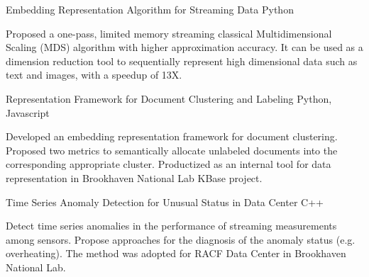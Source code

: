 


\begin{cventries}


\projentry
{Embedding Representation Algorithm for Streaming Data} %
{Python} %
{ 
\begin{cvitems}
\item{Proposed a one-pass, limited memory streaming classical Multidimensional Scaling ({MDS}) algorithm with higher approximation accuracy. It can be used as a dimension reduction tool to sequentially represent high dimensional data such as text and images, with a speedup of 13X.}
\end{cvitems}
}


\projentry
{Representation Framework for Document Clustering and Labeling} %
{Python, Javascript} %
{ 
\begin{cvitems}
\item{Developed an embedding representation framework for document clustering. Proposed two metrics to semantically allocate unlabeled documents into the corresponding appropriate cluster. Productized as an internal tool for data representation in Brookhaven National Lab KBase project.}
\end{cvitems}
}


\projentry
{Time Series Anomaly Detection for Unusual Status in Data Center} %
{C++} %
{ %
\begin{cvitems}
\item{Detect time series anomalies in the performance of streaming measurements among sensors. Propose approaches for the diagnosis of the anomaly status (e.g. overheating). The method was adopted for RACF Data Center in Brookhaven National Lab.}
\end{cvitems}
}


\end{cventries}
